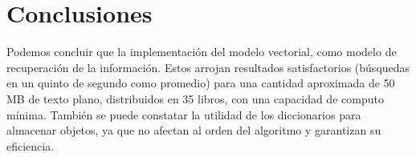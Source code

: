 \documentclass[a4paper, 12pt]{article}
\begin{document}
\section{Conclusiones}
Podemos concluir que la implementación del modelo vectorial, como modelo de recuperación de la información. Estos arrojan resultados satisfactorios (búsquedas en un quinto de segundo como promedio) para una cantidad aproximada de 50 MB de texto plano, distribuidos en 35 libros, con una capacidad de computo mínima. También se puede constatar la utilidad de los diccionarios para almacenar objetos, ya que no afectan al orden del algoritmo y garantizan su eficiencia.
\end{document}
